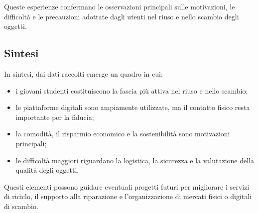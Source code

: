 \documentclass[12pt,a4paper]{article}
\begin{document}
Queste esperienze confermano le osservazioni principali sulle motivazioni, le difficoltà e le precauzioni adottate dagli utenti nel riuso e nello scambio degli oggetti.  

\subsection{Sintesi}

In sintesi, dai dati raccolti emerge un quadro in cui:  
\begin{itemize}
    \item i giovani studenti costituiscono la fascia più attiva nel riuso e nello scambio;  
    \item le piattaforme digitali sono ampiamente utilizzate, ma il contatto fisico resta importante per la fiducia;  
    \item la comodità, il risparmio economico e la sostenibilità sono motivazioni principali;  
    \item le difficoltà maggiori riguardano la logistica, la sicurezza e la valutazione della qualità degli oggetti.  
\end{itemize}
Questi elementi possono guidare eventuali progetti futuri per migliorare i servizi di riciclo, il supporto alla riparazione e l’organizzazione di mercati fisici o digitali di scambio.  


\newpage
\printbibliography
\end{document}
